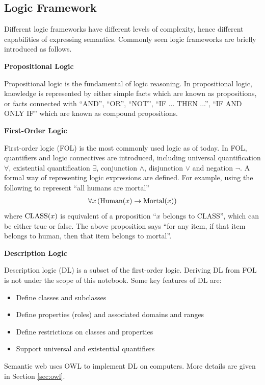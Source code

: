 \subsection{Logic Framework} \label{subsec:knowledgeandlogic}

Different logic frameworks have different levels of complexity, hence different capabilities of expressing semantics. Commonly seen logic frameworks are briefly introduced as follows.

\vspace{0.1in}
\noindent \textbf{Propositional Logic}
\vspace{0.1in}

Propositional logic is the fundamental of logic reasoning. In propositional logic, knowledge is represented by either simple facts which are known as propositions, or facts connected with ``AND'', ``OR'', ``NOT'', ``IF ... THEN ...'', ``IF AND ONLY IF'' which are known as compound propositions.

\vspace{0.1in}
\noindent \textbf{First-Order Logic}
\vspace{0.1in}

First-order logic (FOL) is the most commonly used logic as of today. In FOL, quantifiers and logic connectives are introduced, including universal quantification $\forall$, existential quantification $\exists$, conjunction $\land$, disjunction $\lor$ and negation $\neg$. A formal way of representing logic expressions are defined. For example, using the following to represent ``all humans are mortal''
\begin{eqnarray}
	\forall x \left(\textup{Human}(x) \rightarrow \textup{Mortal}(x)\right) \nonumber
\end{eqnarray}
where $\textup{CLASS}(x)$ is equivalent of a proposition ``$x$ belongs to CLASS'', which can be either true or false. The above proposition says ``for any item, if that item belongs to human, then that item belongs to mortal''.

\vspace{0.1in}
\noindent \textbf{Description Logic}
\vspace{0.1in}

Description logic (DL) is a subset of the first-order logic. Deriving DL from FOL is not under the scope of this notebook. Some key features of DL are:
\begin{itemize}
	\item Define classes and subclasses
	\item Define properties (roles) and associated domains and ranges
	\item Define restrictions on classes and properties
	\item Support universal and existential quantifiers
\end{itemize}
Semantic web uses OWL to implement DL on computers. More details are given in Section \ref{sec:owl}.

